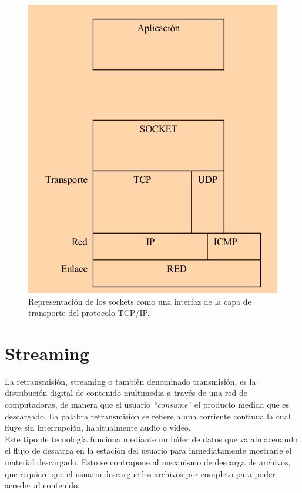 \begin{figure}[H]
  \begin{center}
    \includegraphics[scale=0.5]{imagenes/modelo-tcp-ip-socket.png}
  \end{center}
  \caption{ Representación de los sockets como una interfaz de la capa de transporte del protocolo TCP/IP.}
  \label{diagram:socket}
\end{figure}


\section{Streaming}
\label{sec:def-streaming}

La retransmisión, streaming o también denominado transmisión, es la distribución digital de contenido multimedia a través de una red de computadoras, 
de manera que el usuario \emph{``consume''} el producto medida que es descargado. La palabra retransmisión se refiere a una corriente continua la cual fluye sin interrupción,
habitualmente audio o vídeo.\\

Este tipo de tecnología funciona mediante un búfer de datos que va almacenando el flujo de descarga en la estación del usuario para inmediatamente mostrarle el material descargado. Esto se contrapone al mecanismo de
descarga de archivos, que requiere que el usuario descargue los archivos por completo para poder acceder al contenido.\\

